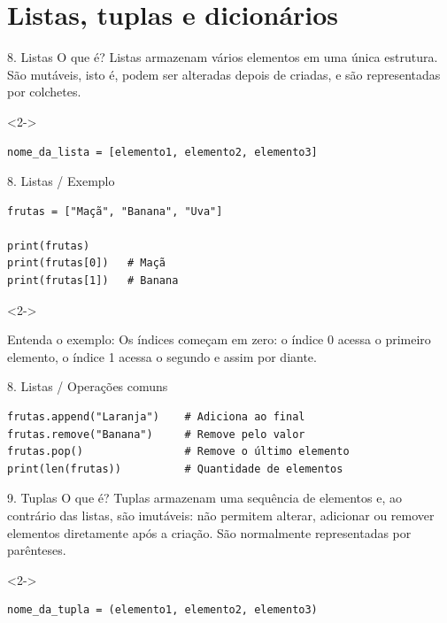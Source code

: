 \section{Listas, tuplas e dicionários}

\begin{frame}[fragile,t]{8. Listas}
O que é? Listas armazenam vários elementos em uma única estrutura. São mutáveis, isto é, podem ser alteradas depois de criadas, e são representadas por colchetes.\par
\begin{visibleenv}<2->
\begin{lstlisting}
nome_da_lista = [elemento1, elemento2, elemento3]
\end{lstlisting}
\end{visibleenv}
\end{frame}

\begin{frame}[fragile,t]{8. Listas / Exemplo}
\begin{lstlisting}
frutas = ["Maçã", "Banana", "Uva"]

print(frutas)
print(frutas[0])   # Maçã
print(frutas[1])   # Banana
\end{lstlisting}
\begin{visibleenv}<2->
\begin{EMASCnote}
Entenda o exemplo: Os índices começam em zero: o índice 0 acessa o primeiro elemento, o índice 1 acessa o segundo e assim por diante.
\end{EMASCnote}
\end{visibleenv}
\end{frame}

\begin{frame}[fragile,t]{8. Listas / Operações comuns}
\begin{lstlisting}
frutas.append("Laranja")    # Adiciona ao final
frutas.remove("Banana")     # Remove pelo valor
frutas.pop()                # Remove o último elemento
print(len(frutas))          # Quantidade de elementos
\end{lstlisting}
\end{frame}

\begin{frame}[fragile,t]{9. Tuplas}
O que é? Tuplas armazenam uma sequência de elementos e, ao contrário das listas, são imutáveis: não permitem alterar, adicionar ou remover elementos diretamente após a criação. São normalmente representadas por parênteses.\par
\begin{visibleenv}<2->
\begin{lstlisting}
nome_da_tupla = (elemento1, elemento2, elemento3)
\end{lstlisting}
\end{visibleenv}
\end{frame}

